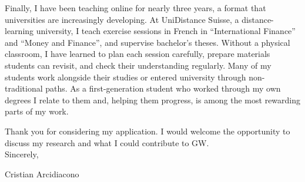 \documentclass[11pt]{article}
\begin{document}
Finally, I have been teaching online for nearly three years, a format that universities are increasingly developing. At UniDistance Suisse, a distance-learning university, I teach exercise sessions in French in ``International Finance'' and ``Money and Finance'', and supervise bachelor's theses. Without a physical classroom, I have learned to plan each session carefully, prepare materials students can revisit, and check their understanding regularly. Many of my students work alongside their studies or entered university through non-traditional paths. As a first-generation student who worked through my own degrees I relate to them and, helping them progress, is among the most rewarding parts of my work. %

Thank you for considering my application. I would welcome the opportunity to discuss my research and what I could contribute to GW. \\

Sincerely,

Cristian Arcidiacono
\end{document}
